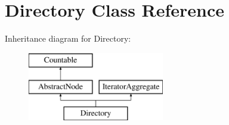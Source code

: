\hypertarget{class_sebastian_bergmann_1_1_code_coverage_1_1_node_1_1_directory}{}\section{Directory Class Reference}
\label{class_sebastian_bergmann_1_1_code_coverage_1_1_node_1_1_directory}
Inheritance diagram for Directory\+:\begin{figure}[H]
\begin{center}
\leavevmode
\includegraphics[height=3.000000cm]{class_sebastian_bergmann_1_1_code_coverage_1_1_node_1_1_directory}
\end{center}
\end{figure}
